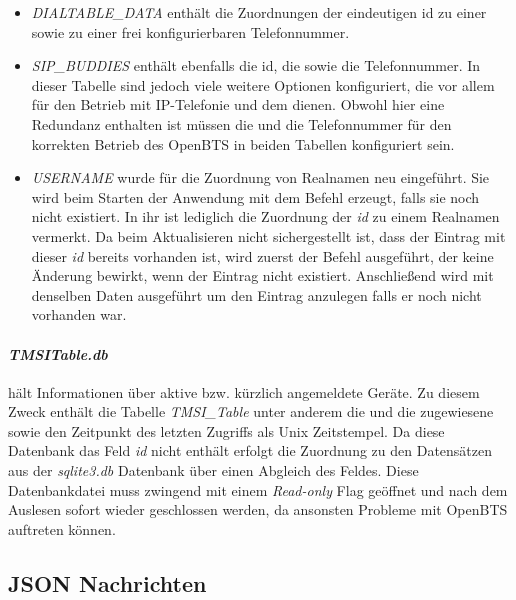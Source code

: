 \begin{itemize}
	\item \textit{DIALTABLE\_DATA} enthält die Zuordnungen der eindeutigen id zu einer \IMSI sowie zu einer frei konfigurierbaren Telefonnummer.
	
	\item \textit{SIP\_BUDDIES} enthält ebenfalls die id, die \IMSI sowie die Telefonnummer. In dieser Tabelle sind jedoch viele weitere Optionen konfiguriert, die vor allem für den Betrieb mit IP-Telefonie und dem \SIP dienen. Obwohl hier eine Redundanz enthalten ist müssen die \IMSI und die Telefonnummer für den korrekten Betrieb des OpenBTS in beiden Tabellen konfiguriert sein.
	
	\item \textit{USERNAME} wurde für die Zuordnung von Realnamen neu eingeführt. Sie wird beim Starten der Anwendung mit dem \SQL Befehl   erzeugt, falls sie noch nicht existiert. In ihr ist lediglich die Zuordnung der \textit{id} zu einem Realnamen vermerkt. Da beim Aktualisieren nicht sichergestellt ist, dass der Eintrag mit dieser \textit{id} bereits vorhanden ist, wird zuerst der Befehl  ausgeführt, der keine Änderung bewirkt, wenn der Eintrag nicht existiert. Anschließend wird  mit denselben Daten ausgeführt um den Eintrag anzulegen falls er noch nicht vorhanden war.
\end{itemize}


\paragraph{\textit{TMSITable.db}} hält Informationen über aktive bzw. kürzlich angemeldete Geräte. Zu diesem Zweck enthält die Tabelle \textit{TMSI\_Table} unter anderem die \IMSI und die zugewiesene \TMSI sowie den Zeitpunkt des letzten Zugriffs als Unix Zeitstempel. Da diese Datenbank das Feld \textit{id} nicht enthält erfolgt die Zuordnung zu den Datensätzen aus der \textit{sqlite3.db} Datenbank über einen Abgleich des \IMSI Feldes. Diese Datenbankdatei muss zwingend mit einem \textit{Read-only} Flag geöffnet und nach dem Auslesen sofort wieder geschlossen werden, da ansonsten Probleme mit OpenBTS auftreten können.

\subsection{JSON Nachrichten}
\label{subsec:json}

